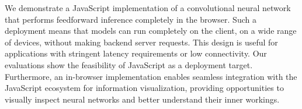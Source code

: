 We demonstrate a JavaScript implementation of a convolutional neural network that performs feedforward inference completely in the browser. Such a deployment means that models can run completely on the client, on a wide range of devices, without making backend server requests. This design is useful for applications with stringent latency requirements or low connectivity. Our evaluations show the feasibility of JavaScript as a deployment target. Furthermore, an in-browser implementation enables seamless integration with the JavaScript ecosystem for information visualization, providing opportunities to visually inspect neural networks and better understand their inner workings.
